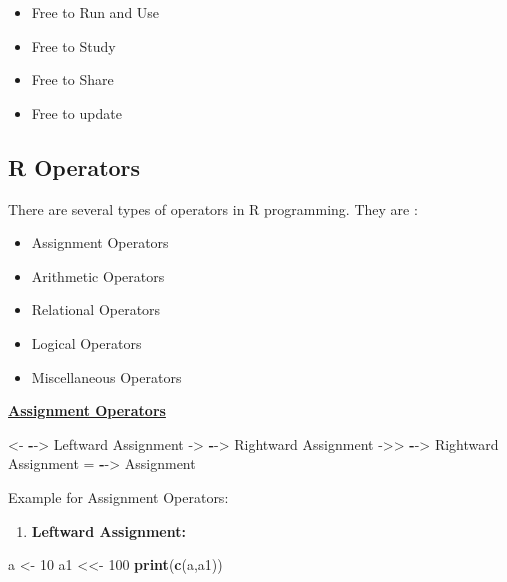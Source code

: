 \documentclass[
]{article}
\newenvironment{Shaded}{\begin{snugshade}}{\end{snugshade}}
\newcommand{\DecValTok}[1]{\textcolor[rgb]{0.00,0.00,0.81}{#1}}
\newcommand{\FunctionTok}[1]{\textcolor[rgb]{0.13,0.29,0.53}{\textbf{#1}}}
\newcommand{\NormalTok}[1]{#1}
\newcommand{\OtherTok}[1]{\textcolor[rgb]{0.56,0.35,0.01}{#1}}
\newcommand{\SpecialCharTok}[1]{\textcolor[rgb]{0.81,0.36,0.00}{\textbf{#1}}}
\providecommand{\tightlist}{%
  \setlength{\itemsep}{0pt}\setlength{\parskip}{0pt}}
\begin{document}
\begin{itemize}
\item
  Free to Run and Use
\item
  Free to Study
\item
  Free to Share
\item
  Free to update
\end{itemize}

\subsection{R Operators}\label{r-operators}

There are several types of operators in R programming. They are :

\begin{itemize}
\item
  Assignment Operators
\item
  Arithmetic Operators
\item
  Relational Operators
\item
  Logical Operators
\item
  Miscellaneous Operators
\end{itemize}

\ul{\textbf{Assignment Operators}}

\begin{Shaded}
\begin{Highlighting}[]
\OtherTok{\textless{}{-}}  \SpecialCharTok{{-}}\OtherTok{{-}\textgreater{}}\NormalTok{ Leftward Assignment}
\OtherTok{{-}\textgreater{}}  \SpecialCharTok{{-}}\OtherTok{{-}\textgreater{}}\NormalTok{ Rightward Assignment}
\OtherTok{{-}\textgreater{}\textgreater{}} \SpecialCharTok{{-}}\OtherTok{{-}\textgreater{}}\NormalTok{ Rightward Assignment}
\OtherTok{=}   \SpecialCharTok{{-}}\OtherTok{{-}\textgreater{}}\NormalTok{ Assignment}
\end{Highlighting}
\end{Shaded}

Example for Assignment Operators:

\begin{enumerate}
\def\labelenumi{\arabic{enumi}.}
\tightlist
\item
  \textbf{Leftward Assignment:}
\end{enumerate}

\begin{Shaded}
\begin{Highlighting}[]
\NormalTok{a }\OtherTok{\textless{}{-}} \DecValTok{10}
\NormalTok{a1 }\OtherTok{\textless{}\textless{}{-}} \DecValTok{100}
\FunctionTok{print}\NormalTok{(}\FunctionTok{c}\NormalTok{(a,a1))}
\end{Highlighting}
\end{Shaded}
\end{document}
